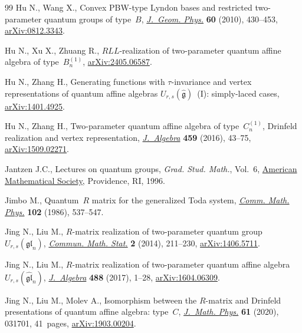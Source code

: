 \begin{thebibliography}{99}
Hu N., Wang X., Convex {PBW}-type {L}yndon bases and restricted two-parameter
 quantum groups of type~{$B$},
 \href{https://doi.org/10.1016/j.geomphys.2009.11.005}{\textit{J.~Geom.
 Phys.}} \textbf{60} (2010), 430--453,
 \href{http://arxiv.org/abs/0812.3343}{arXiv:0812.3343}.

Hu N., Xu X., Zhuang R., $RLL$-realization of two-parameter quantum affine
 algebra of type~$B^{(1)}_n$,
 \href{http://arxiv.org/abs/2405.06587}{arXiv:2405.06587}.

Hu N., Zhang H., Generating functions with $\tau$-invariance and vertex
 representations of quantum affine algebras
 $U_{r,s}(\widehat{\mathfrak{g}})$~(I): simply-laced cases,
 \href{http://arxiv.org/abs/1401.4925}{arXiv:1401.4925}.

Hu N., Zhang H., Two-parameter quantum affine algebra of type~{$C^{(1)}_n$},
 {D}rinfeld realization and vertex representation,
 \href{https://doi.org/10.1016/j.jalgebra.2016.03.031}{\textit{J.~Algebra}}
 \textbf{459} (2016), 43--75,
 \href{http://arxiv.org/abs/1509.02271}{arXiv:1509.02271}.

Jantzen J.C., Lectures on quantum groups, \textit{Grad. Stud. Math.}, Vol.~6,
 \href{https://doi.org/10.1090/gsm/006}{American Mathematical Society},
 Providence, RI, 1996.

Jimbo M., Quantum~{$R$} matrix for the generalized {T}oda system,
 \href{https://doi.org/10.1007/BF01221646}{\textit{Comm. Math. Phys.}}
 \textbf{102} (1986), 537--547.

Jing N., Liu M., {$R$}-matrix realization of two-parameter quantum
 group~{$U_{r,s}(\mathfrak{gl}_n)$},
 \href{https://doi.org/10.1007/s40304-014-0037-7}{\textit{Commun. Math.
 Stat.}} \textbf{2} (2014), 211--230,
 \href{http://arxiv.org/abs/1406.5711}{arXiv:1406.5711}.

Jing N., Liu M., $R$-matrix realization of two-parameter quantum affine
 algebra~{$U_{r,s}(\widehat{\mathfrak{gl}}_n)$},
 \href{https://doi.org/10.1016/j.jalgebra.2017.05.028}{\textit{J.~Algebra}}
 \textbf{488} (2017), 1--28,
 \href{http://arxiv.org/abs/1604.06309}{arXiv:1604.06309}.

Jing N., Liu M., Molev A., Isomorphism between the {$R$}-matrix and {D}rinfeld
 presentations of quantum affine algebra: type~{$C$},
 \href{https://doi.org/10.1063/1.5133854}{\textit{J.~Math. Phys.}} \textbf{61}
 (2020), 031701, 41~pages,
 \href{http://arxiv.org/abs/1903.00204}{arXiv:1903.00204}.


\end{thebibliography}

